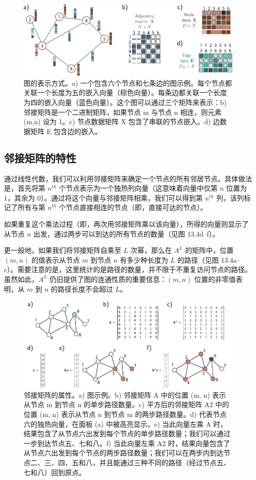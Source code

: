 \documentclass[lang=cn,newtx,10pt,scheme=chinese]{elegantbook}
\begin{document}
\begin{figure}[ht!]
\centering
\includegraphics[width=0.7\linewidth]{PDFFigures/UDLChap13PDF/GraphNodeEdgeAdjacency.pdf}
\caption{图的表示方式。a) 一个包含六个节点和七条边的图示例。每个节点都关联一个长度为五的嵌入向量（棕色向量）。每条边都关联一个长度为四的嵌入向量（蓝色向量）。这个图可以通过三个矩阵来表示：b) 邻接矩阵是一个二进制矩阵，如果节点 m 与节点 n 相连，则元素 (m,n) 设为 1。c) 节点数据矩阵 X 包含了串联的节点嵌入。d) 边数据矩阵 E 包含边的嵌入。}
\end{figure}


\subsection{邻接矩阵的特性}
通过线性代数，我们可以利用邻接矩阵来确定一个节点的所有邻居节点。具体做法是，首先将第 \(n^{th}\) 个节点表示为一个独热列向量（这意味着向量中仅第 \(n\) 位置为 1，其余为 0）。通过将这个向量与邻接矩阵相乘，我们可以得到第 \(n^{th}\) 列，该列标记了所有与第 \(n^{th}\) 个节点直接相连的节点（即，直接可达的节点）。

如果重复这个乘法过程（即，再次用邻接矩阵乘以该向量），所得的向量则显示了从节点 \(n\) 出发，通过两步可以到达的所有节点的数量（见图 13.4d–f）。

更一般地，如果我们将邻接矩阵自乘至 \(L\) 次幂，那么在 \(A^L\) 的矩阵中，位置 \((m, n)\) 的值表示从节点 \(m\) 到节点 \(n\) 有多少种长度为 \(L\) 的路径（见图 13.4a–c）。需要注意的是，这里统计的是路径的数量，并不限于不重复访问节点的路径。虽然如此，\(A^L\) 仍旧提供了图的连通性质的重要信息：\((m, n)\) 位置的非零值表明，从 \(m\) 到 \(n\) 的路径长度不会超过 \(L\)。

\begin{figure}[ht!]
\centering
\includegraphics[width=0.7\linewidth]{PDFFigures/UDLChap13PDF/GraphAdjacencyMultiply.pdf}
\caption{邻接矩阵的属性。a) 图示例。b) 邻接矩阵 A 中的位置 (m, n) 表示从节点 m 到节点 n 的单步路径数量。c) 平方后的邻接矩阵 A2 中的位置 (m, n) 表示从节点 n 到节点 m 的两步路径数量。d) 代表节点六的独热向量，在面板 (a) 中被高亮显示。e) 当此向量左乘 A 时，结果包含了从节点六出发到每个节点的单步路径数量；我们可以通过一步到达节点五、七和八。f) 当此向量左乘 A2 时，结果向量包含了从节点六出发到每个节点的两步路径数量；我们可以在两步内到达节点二、三、四、五和八，并且能通过三种不同的路径（经过节点五、七和八）回到原点。}
\end{figure}
\end{document}
